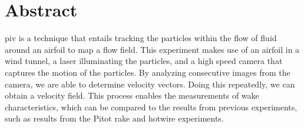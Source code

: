 \thispagestyle{plain} %



\chapter*{Abstract} %

\acrfull{piv} is a technique that entails tracking the particles within the flow of fluid around an airfoil to map a flow field. This experiment makes use of an airfoil in a wind tunnel, a laser illuminating the particles, and a high speed camera that captures the motion of the particles. By analyzing consecutive images from the camera, we are able to determine velocity vectors. Doing this repeatedly, we can obtain a velocity field. This process enables the measurements of wake characteristics, which can be compared to the results from previous experiments, such as results from the Pitot rake and hotwire experiments.
